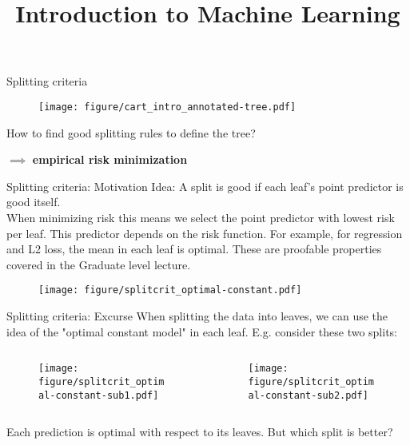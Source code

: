 \documentclass[11pt,compress,t,notes=noshow, xcolor=table]{beamer}
\title{Introduction to Machine Learning}
\institute{\href{https://compstat-lmu.github.io/lecture_i2ml/}{compstat-lmu.github.io/lecture\_i2ml}}
\date{}
\begin{document}
\sloppy


\begin{frame}{Splitting criteria}

 \begin{figure}
    \centering
      \texttt{[image: figure/cart\_intro\_annotated-tree.pdf]}
    \end{figure}

How to find good splitting rules to define the tree?
\lz

$\implies$ \textbf{empirical risk minimization}

\end{frame}

\begin{vbframe}{Splitting criteria: Motivation}
Idea: A split is good if each leaf's point predictor is good itself. \\

When minimizing risk this means we select the point predictor with lowest risk per leaf.
This predictor depends on the risk function.
For example, for regression and L2 loss, the mean in each leaf is optimal.
These are proofable properties covered in the Graduate level lecture.

\begin{figure}
\texttt{[image: figure/splitcrit\_optimal-constant.pdf]} 
\end{figure}



\end{vbframe}



\begin{vbframe}{Splitting criteria: Excurse}
When splitting the data into leaves, we can use the idea of the "optimal constant model" in each leaf. E.g. consider these two splits:

\begin{columns}
\begin{column}{0.5\textwidth}

\color{fgcolor}

\begin{figure}
\texttt{[image: figure/splitcrit\_optimal-constant-sub1.pdf]} 
\end{figure}

 
\end{column}
\begin{column}{0.5\textwidth}

\begin{figure}
\texttt{[image: figure/splitcrit\_optimal-constant-sub2.pdf]} 
\end{figure}

\end{column}
\end{columns}

Each prediction is optimal with respect to its leaves. But which split is better?

\end{vbframe}
\end{document}
